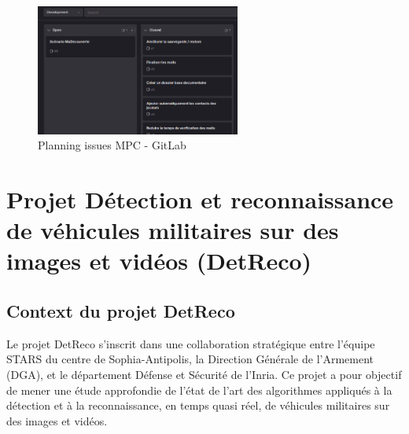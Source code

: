 \begin{figure}[h]
	\center
	\includegraphics[width=0.6\textwidth]{./images/gitlab_mpc.png}
	\caption[Planification des issues MPC]{Planning issues MPC - GitLab}\label{fig:gitlab_mpc}
\end{figure}





































\section{Projet Détection et reconnaissance de véhicules militaires sur des images et vidéos (DetReco)}

\subsection{Context du projet DetReco}

Le projet DetReco s'inscrit dans une collaboration stratégique entre l'équipe STARS du centre de Sophia-Antipolis, la Direction Générale de l'Armement (DGA), et le département Défense et Sécurité de l'Inria. Ce projet a pour objectif de mener une étude approfondie de l'état de l'art des algorithmes appliqués à la détection et à la reconnaissance, en temps quasi réel, de véhicules militaires sur des images et vidéos.



